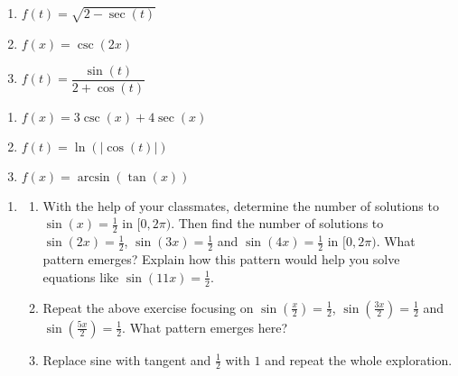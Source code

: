 \documentclass{ximera}
\begin{document}
\begin{multicols}{3}

\begin{enumerate}

\setcounter{enumi}{\value{HW}}

\item $f(t) = \sqrt{2 - \sec(t)}$ 
\item $f(x) = \csc(2x)$ 
\item $f(t) = \dfrac{\sin(t)}{2 + \cos(t)}$

\setcounter{HW}{\value{enumi}}

\end{enumerate}

\end{multicols}

\begin{multicols}{3}

\begin{enumerate}

\setcounter{enumi}{\value{HW}}

\item $f(x) = 3\csc(x) + 4\sec(x)$ 
\item $f(t) = \ln\left( |\cos(t)| \right)$
\item $f(x) = \arcsin(\tan(x))$ \label{domainlast}

\setcounter{HW}{\value{enumi}}

\end{enumerate}

\end{multicols}

\begin{enumerate}

\setcounter{enumi}{\value{HW}}

\item \label{frequencynumberconnection} \begin{enumerate}

\item With the help of your classmates, determine the number of solutions to $\sin(x) = \frac{1}{2}$ in $[0,2\pi)$.  Then find the number of solutions to $\sin(2x) = \frac{1}{2}$,  $\sin(3x) = \frac{1}{2}$ and $\sin(4x) = \frac{1}{2}$ in $[0,2\pi)$. What pattern emerges?   Explain how this pattern would help you solve equations like $\sin(11x) = \frac{1}{2}$.  

\item Repeat the above exercise focusing on  $\sin\left(\frac{x}{2}\right)  = \frac{1}{2}$,  $\sin\left(\frac{3x}{2}\right)  = \frac{1}{2}$ and $\sin\left(\frac{5x}{2}\right)  = \frac{1}{2}$.  What pattern emerges here?  

\item  Replace sine with tangent and $\frac{1}{2}$ with $1$ and repeat the whole exploration.

\end{enumerate}

\setcounter{HW}{\value{enumi}}

\end{enumerate}
\end{document}
